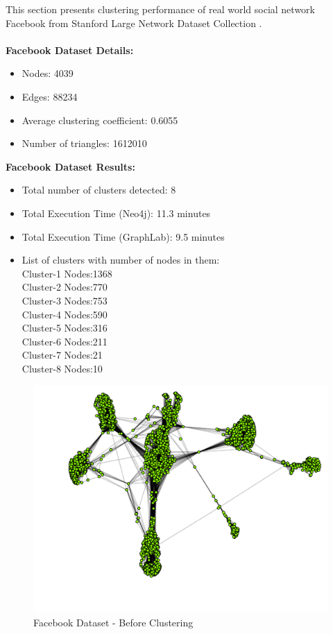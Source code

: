 This section presents clustering performance of real world social network Facebook \cite{facebookdata} from Stanford Large Network Dataset Collection \cite{snap}.\\
\\
\textbf{Facebook Dataset Details:}
\begin{itemize}
	\item
	Nodes: 4039
	\item
	Edges: 88234
	\item
	Average clustering coefficient:	0.6055
	\item
	Number of triangles:	1612010
\end{itemize}
\noindent
\textbf{Facebook Dataset Results:}
\begin{itemize}
	\item
	Total number of clusters detected: 8
	\item
	Total Execution Time (Neo4j): 11.3 minutes
	\item
	Total Execution Time (GraphLab): 9.5 minutes
	\item
	List of clusters with number of nodes in them:\\
	Cluster-1 Nodes:1368\\
	Cluster-2 Nodes:770\\
	Cluster-3 Nodes:753\\
	Cluster-4 Nodes:590\\
	Cluster-5 Nodes:316\\
	Cluster-6 Nodes:211\\
	Cluster-7 Nodes:21\\
	Cluster-8 Nodes:10\\	
\end{itemize}
\begin{figure}[H]
	\centering
	\includegraphics[scale=0.4, trim=0 0 20 0]{Images/before_facebook.pdf}
	\caption{Facebook Dataset - Before Clustering\label{fig:fb-before}}
\end{figure}
